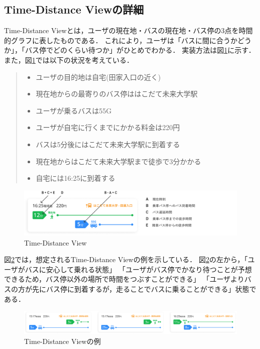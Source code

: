 \subsection{Time-Distance Viewの詳細}
Time-Distance Viewとは，ユーザの現在地・バスの現在地・バス停の3点を時間的グラフに表したものである．
これにより，ユーザは「バスに間に合うかどうか」，「バス停でどのくらい待つか」がひとめでわかる．
実装方法は図\ref{fig:feature_timedistanceview}に示す．
また，図\ref{fig:feature_timedistanceview}では以下の状況を考えている．
\begin{quote}
    \begin{itemize}
        \item ユーザの目的地は自宅(田家入口の近く)
        \item 現在地からの最寄りのバス停ははこだて未来大学駅
        \item ユーザが乗るバスは55G
        \item ユーザが自宅に行くまでにかかる料金は220円
        \item バスは5分後にはこだて未来大学駅に到着する
        \item 現在地からはこだて未来大学駅まで徒歩で3分かかる
        \item 自宅には16:25に到着する
    \end{itemize}
\end{quote}
\begin{figure}[H]
    \centering
    \includegraphics[width=14cm]{images/feature_timedistanceview.png}
    \caption{Time-Distance View}
    \label{fig:feature_timedistanceview}
\end{figure}
図\ref{fig:feature_timedistanceview2}では，想定されるTime-Distance Viewの例を示している．
図\ref{fig:feature_timedistanceview2}の左から，「ユーザがバスに安心して乗れる状態」
「ユーザがバス停でかなり待つことが予想できるため，バス停以外の場所で時間をつぶすことができる」
「ユーザよりバスの方が先にバス停に到着するが，走ることでバスに乗ることができる」状態である．
\begin{figure}[H]
    \centering
    \includegraphics[width=14cm]{images/feature_timedistanceview2.png}
    \caption{Time-Distance Viewの例}
    \label{fig:feature_timedistanceview2}
\end{figure}

